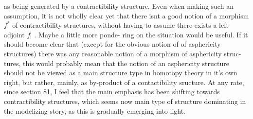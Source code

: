 as  being generated by a contractibility structure.  Even when making
such an assumption,  it is not wholly clear yet that there isnt a good
notion of a morphism $f^{*}$ of contractibility structures,  without having
to assume there exists a left adjoint $f_{!}$ .  Maybe a little more ponde-%
ring on the situation would be useful.  If it should become clear that
(except for the obvious notion of \hand{\uline{\textcolor{black}{equivalence}}} of asphericity structures)
there was \hand{\uline{\textcolor{black}{not}}} any reasonable notion of a morphism of asphericity struc-%
tures,  this would probably mean that the notion of an asphericity
structure should not be viewed as a main structure type in homotopy
theory in it's own right,  but rather,  mainly,  as   by-product 
 of a contactibility sructure.  At any rate,
since section 81,  I feel that the main emphasis has  been shifting
towards contractibility structures,  which seems now \hand{\uline{\textcolor{black}{the}}} main type of
structure dominating  in the modelizing story,  as this  is gradually
emerging into light.

